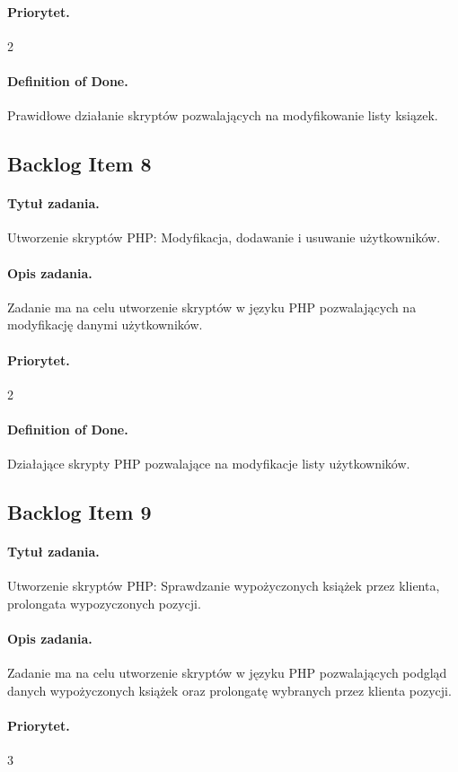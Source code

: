 \documentclass[a4paper]{article}
\begin{document}
\paragraph{Priorytet.} 2
\paragraph{Definition of Done.} Prawidłowe działanie skryptów pozwalających na modyfikowanie listy ksiązek.

\subsection{Backlog Item 8}
\paragraph{Tytuł zadania.} Utworzenie skryptów PHP: Modyfikacja, dodawanie i usuwanie użytkowników.
\paragraph{Opis zadania.} Zadanie ma na celu utworzenie skryptów w języku PHP pozwalających na modyfikację danymi użytkowników.
\paragraph{Priorytet.} 2
\paragraph{Definition of Done.} Działające skrypty PHP pozwalające na modyfikacje listy użytkowników.

\subsection{Backlog Item 9}
\paragraph{Tytuł zadania.} Utworzenie skryptów PHP: Sprawdzanie wypożyczonych książek przez klienta, prolongata wypozyczonych pozycji.
\paragraph{Opis zadania.} Zadanie ma na celu utworzenie skryptów w języku PHP pozwalających podgląd danych wypożyczonych książek oraz prolongatę wybranych przez klienta pozycji.
\paragraph{Priorytet.} 3
\end{document}
